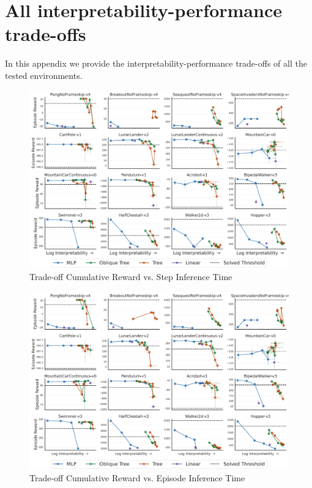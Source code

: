 \section{All interpretability-performance trade-offs}\label{sec:trade-offs-full}
In this appendix we provide the interpretability-performance trade-offs of all the tested environments.
\begin{figure}
    \centering
    \includegraphics[width=1\linewidth]{images/images_part3/trade_off_step_times.pdf}
    \caption{Trade-off Cumulative Reward vs. Step Inference Time}
    \label{fig:trade-off}
\end{figure}

\begin{figure}[ht]
    \centering
    \includegraphics[width=0.95\linewidth]{images/images_part3/trade_off.pdf}
    \caption{Trade-off Cumulative Reward vs. Episode Inference Time}
    \label{fig:trade-off-episode}
\end{figure}

